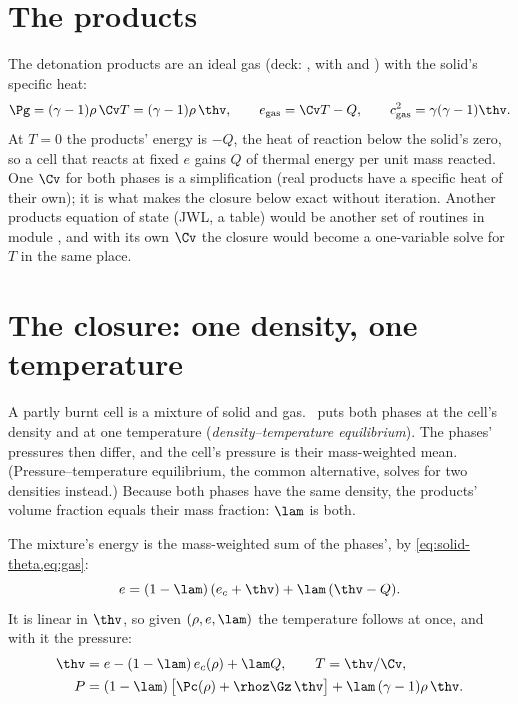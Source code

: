 \section{The products}
\label{sec:products}

The detonation products are an ideal gas (deck: , with  and ) with the solid's specific heat:
\begin{equation}
  \Pg = (\gamma - 1)\rho\,\Cv T = (\gamma - 1)\rho\,\thv, \qquad
  e_{\mathrm{gas}} = \Cv T - Q, \qquad
  c_{\mathrm{gas}}^2 = \gamma(\gamma - 1)\thv.
  \label{eq:gas}
\end{equation}
At $T = 0$ the products' energy is $-Q$, the heat of reaction below the
solid's zero, so a cell that reacts at fixed $e$ gains $Q$ of thermal energy
per unit mass reacted. One $\Cv$ for both phases is a simplification (real products
have a specific heat of their own); it is what makes the closure below exact
without iteration. Another products equation of state (JWL, a
table) would be another set of routines in module , and with
its own $\Cv$ the closure would become a one-variable solve for $T$ in the
same place.

\section{The closure: one density, one temperature}
\label{sec:closure}

A partly burnt cell is a mixture of solid and gas. \bw\ puts both phases at
the cell's density and at one temperature (\emph{density--temperature
equilibrium}). The phases' pressures then differ, and the cell's pressure
is their mass-weighted mean. (Pressure--temperature equilibrium, the common
alternative, solves for two densities instead.) Because both phases have
the same density, the products' volume fraction equals their mass fraction:
$\lam$ is both.

The mixture's energy is the mass-weighted sum of the phases', by
\cref{eq:solid-theta,eq:gas}:
\begin{equation*}
  e = (1 - \lam)\,(e_c + \thv) + \lam\,(\thv - Q).
\end{equation*}
It is linear in $\thv$, so given $(\rho, e, \lam)$ the temperature follows
at once, and with it the pressure:
\begin{align}
  \thv &= e - (1 - \lam)\, e_c(\rho) + \lam Q, \qquad T = \thv/\Cv,
  \label{eq:theta}\\
  P &= (1 - \lam)\,\bigl[\Pc(\rho) + \rhoz\Gz\,\thv\bigr]
     + \lam\,(\gamma - 1)\rho\,\thv.
  \label{eq:pmix}
\end{align}


